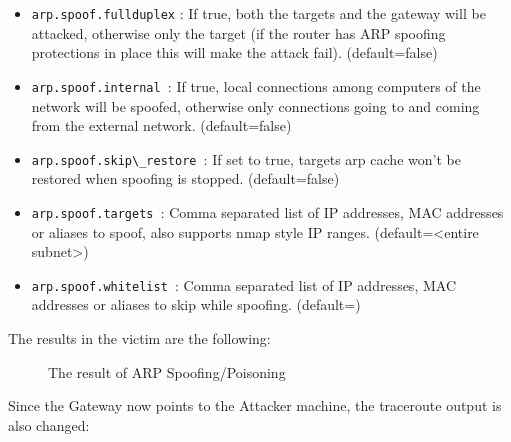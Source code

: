 \documentclass[status=normal,cover=tesi,language=en]{gmeepd}
\begin{document}
\begin{itemize}
 \item  \verb|arp.spoof.fullduplex| : If true, both the targets and the gateway will be attacked, otherwise only the target (if the router has ARP spoofing protections in place this will make the attack fail). (default=false)
 \item     \verb|arp.spoof.internal |: If true, local connections among computers of the network will be spoofed, otherwise only connections going to and coming from the external network. (default=false)
 \item \verb|arp.spoof.skip\_restore |: If set to true, targets arp cache won't be restored when spoofing is stopped. (default=false)
 \item      \verb|arp.spoof.targets |: Comma separated list of IP addresses, MAC addresses or aliases to spoof, also supports nmap style IP ranges. (default=<entire subnet>)
 \item    \verb|arp.spoof.whitelist |: Comma separated list of IP addresses, MAC addresses or aliases to skip while spoofing. (default=)
\end{itemize}

The results in the victim are the following:

\begin{figure}[!hb]
\centering
 \vspace{0.5cm}
 \caption{The result of ARP Spoofing/Poisoning}\label{fig: spoof-before-after}
\end{figure}

\pagebreak

Since the Gateway now points to the Attacker machine, the traceroute output is also changed:

\begin{figure}[!hb]
 \centering
 \vspace{0.5cm}
\end{figure}
\end{document}
